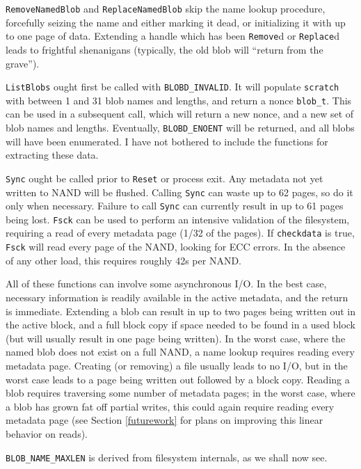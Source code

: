 \documentclass[letterpaper,10pt]{article}
\begin{document}
\texttt{RemoveNamedBlob} and \texttt{ReplaceNamedBlob} skip the name lookup
procedure, forcefully seizing the name and either marking it dead, or
initializing it with up to one page of data. Extending a handle which has been
\texttt{Remove}d or \texttt{Replace}d leads to frightful shenanigans (typically,
the old blob will ``return from the grave'').

\texttt{ListBlobs} ought first be called with \texttt{BLOBD\_INVALID}. It will
populate \texttt{scratch} with between 1 and 31 blob names and lengths, and
return a nonce \texttt{blob\_t}. This can be used in a subsequent call, which
will return a new nonce, and a new set of blob names and lengths. Eventually,
\texttt{BLOBD\_ENOENT} will be returned, and all blobs will have been
enumerated. I have not bothered to include the functions for extracting these
data.

\texttt{Sync} ought be called prior to \texttt{Reset} or process exit. Any
metadata not yet written to NAND will be flushed. Calling \texttt{Sync} can
waste up to 62 pages, so do it only when necessary. Failure to call \texttt{Sync}
can currently result in up to 61 pages being lost. \texttt{Fsck} can be used to
perform an intensive validation of the filesystem, requiring a read of every
metadata page (1/32 of the pages). If \texttt{checkdata} is true, \texttt{Fsck}
will read every page of the NAND, looking for ECC errors. In the absence of
any other load, this requires roughly 42s per NAND.

All of these functions can involve some asynchronous I/O. In the best case,
necessary information is readily available in the active metadata, and the
return is immediate. Extending a blob can result in up to two pages being
written out in the active block, and a full block copy if space needed to be
found in a used block (but will usually result in one page being written).
In the worst case, where the named blob does not exist on a full NAND, a name
lookup requires reading every metadata page. Creating (or removing) a file
usually leads to no I/O, but in the worst case leads to a page being written
out followed by a block copy. Reading a blob requires traversing some number of
metadata pages; in the worst case, where a blob has grown fat off partial
writes, this could again require reading every metadata page (see
Section \ref{futurework} for plans on improving this linear behavior on reads).

\texttt{BLOB\_NAME\_MAXLEN} is derived from filesystem internals, as we shall
now see.
\end{document}
